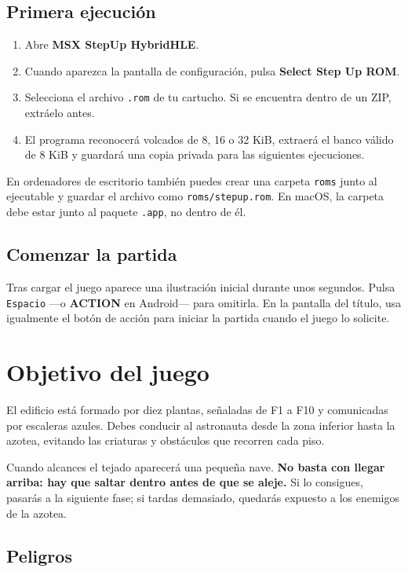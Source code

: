 \documentclass[11pt,a4paper]{article}
\newcommand{\tecla}[1]{%
  \begingroup
  \setlength{\fboxsep}{3pt}%
  \colorbox{softgray}{\texttt{#1}}%
  \endgroup
}
\begin{document}
\subsection{Primera ejecución}

\begin{enumerate}
  \item Abre \textbf{MSX StepUp HybridHLE}.
  \item Cuando aparezca la pantalla de configuración, pulsa
        \textbf{Select Step Up ROM}.
  \item Selecciona el archivo \texttt{.rom} de tu cartucho. Si se encuentra
        dentro de un ZIP, extráelo antes.
  \item El programa reconocerá volcados de 8, 16 o 32 KiB, extraerá el banco
        válido de 8 KiB y guardará una copia privada para las siguientes
        ejecuciones.
\end{enumerate}

En ordenadores de escritorio también puedes crear una carpeta
\texttt{roms} junto al ejecutable y guardar el archivo como
\texttt{roms/stepup.rom}. En macOS, la carpeta debe estar junto al paquete
\texttt{.app}, no dentro de él.

\subsection{Comenzar la partida}

Tras cargar el juego aparece una ilustración inicial durante unos segundos.
Pulsa \tecla{Espacio} ---o \textbf{ACTION} en Android--- para omitirla. En la
pantalla del título, usa igualmente el botón de acción para iniciar la partida
cuando el juego lo solicite.

\section{Objetivo del juego}

El edificio está formado por diez plantas, señaladas de F1 a F10 y comunicadas
por escaleras azules. Debes conducir al astronauta desde la zona inferior
hasta la azotea, evitando las criaturas y obstáculos que recorren cada piso.

Cuando alcances el tejado aparecerá una pequeña nave. \textbf{No basta con
llegar arriba: hay que saltar dentro antes de que se aleje.} Si lo consigues,
pasarás a la siguiente fase; si tardas demasiado, quedarás expuesto a los
enemigos de la azotea.

\subsection{Peligros}
\end{document}

